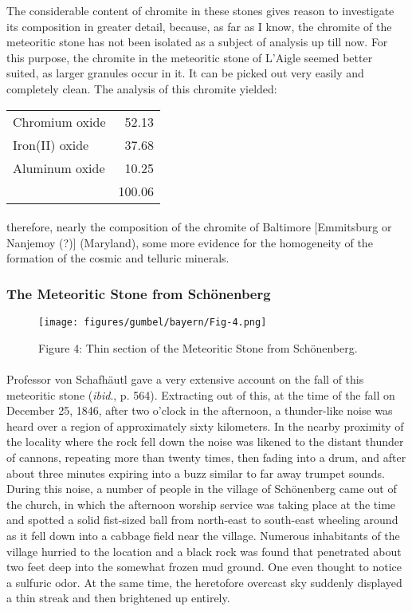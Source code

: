 \documentclass[a4paper, 12pt, oneside]{article}
\begin{document}
The considerable content of chromite in these stones gives reason to investigate its composition in greater detail, because, as far as I know, the chromite of the meteoritic stone has not been isolated as a subject of analysis up till now. For this purpose, the chromite in the meteoritic stone of L'Aigle seemed better suited, as larger granules occur in it. It can be picked out very easily and completely clean. The analysis of this chromite yielded:
\begin{center}
    \begin{tabular}{l r}
        Chromium oxide & 52.13\\
        Iron(II) oxide & 37.68\\
        Aluminum oxide & 10.25\\
         & 100.06\\
    \end{tabular}
\end{center}
\paragraph*{}
therefore, nearly the composition of the chromite of Baltimore [Emmitsburg or Nanjemoy (?)] (Maryland), some more evidence for the homogeneity of the formation of the cosmic and telluric minerals.
\clearpage
\subsubsection{The Meteoritic Stone from Schönenberg}
\begin{figure}[h]
\centering
\texttt{[image: figures/gumbel/bayern/Fig-4.png]}
\caption{Figure 4: Thin section of the Meteoritic Stone from Schönenberg.}
\end{figure}
\paragraph*{}
Professor von Schafhäutl gave a very extensive account on the fall of this meteoritic stone (\emph{ibid}., p. 564). Extracting out of this, at the time of the fall on December 25, 1846, after two o'clock in the afternoon, a thunder-like noise was heard over a region of approximately sixty kilometers. In the nearby proximity of the locality where the rock fell down the noise was likened to the distant thunder of cannons, repeating more than twenty times, then fading into a drum, and after about three minutes expiring into a buzz similar to far away trumpet sounds. During this noise, a number of people in the village of Schönenberg came out of the church, in which the afternoon worship service was taking place at the time and spotted a solid fist-sized ball from north-east to south-east wheeling around as it fell down into a cabbage field near the village. Numerous inhabitants of the village hurried to the location and a black rock was found that penetrated about two feet deep into the somewhat frozen mud ground. One even thought to notice a sulfuric odor. At the same time, the heretofore overcast sky suddenly displayed a thin streak and then brightened up entirely.
\end{document}
